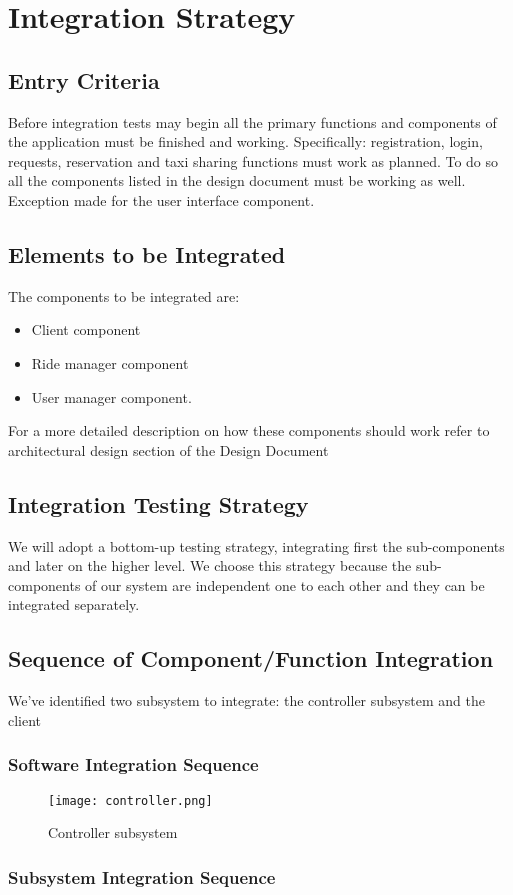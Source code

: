 \section{Integration Strategy}

\subsection{Entry Criteria}
Before integration tests may begin all the primary functions and components of the application must be finished and working.
Specifically: registration, login, requests, reservation and taxi sharing functions must work as planned. To do so all the components listed in the design document must be working as well. Exception made for the user interface component.

\subsection{Elements to be Integrated}
The components to be integrated are:
\begin{itemize}
	\item Client component
	\item Ride manager component
	\item User manager component. 
\end{itemize}
For a more detailed description on how these components should work refer to architectural design section of the Design Document

\subsection{Integration Testing Strategy}
We will adopt a bottom-up testing strategy, integrating first the sub-components and later on the higher level. 
We choose this strategy because the sub-components of our system are independent one to each other and they can be integrated separately.

\subsection{Sequence of Component/Function Integration}
We've identified two subsystem to integrate: the controller subsystem and the client 

\subsubsection{Software Integration Sequence}
\begin{figure}[h]
		\centering
		\texttt{[image: controller.png]}
		\caption{Controller subsystem}
\end{figure}
\subsubsection{Subsystem Integration Sequence}


